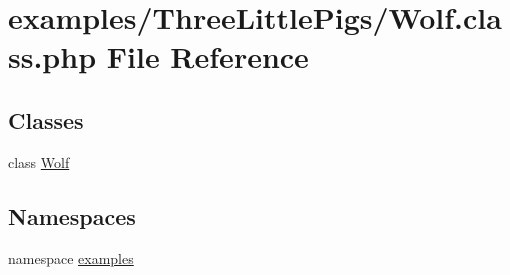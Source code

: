 \hypertarget{_wolf_8class_8php}{
\section{examples/ThreeLittlePigs/Wolf.class.php File Reference}
\label{_wolf_8class_8php}
}
\subsection*{Classes}
\begin{CompactItemize}
\item 
class \hyperlink{class_wolf}{Wolf}
\end{CompactItemize}
\subsection*{Namespaces}
\begin{CompactItemize}
\item 
namespace \hyperlink{namespaceexamples}{examples}
\end{CompactItemize}
